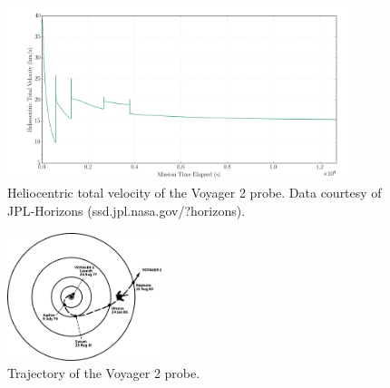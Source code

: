 \documentclass{article}
\begin{document}
		\begin{figure}[hb]
			\centering{}
			\includegraphics[width=0.9\textwidth]{Voyager_Trajectory_2.png}
			\caption{Heliocentric total velocity of the Voyager 2 probe.  Data courtesy of JPL-Horizons (ssd.jpl.nasa.gov/?horizons).}
		\end{figure}
		
		\begin{figure}[hb]
			\centering{}
			\includegraphics[width=0.4\textwidth]{Voyager_Trajectory_3.png}
			\caption{Trajectory of the Voyager 2 probe.}
		\end{figure}
	
\end{document}
